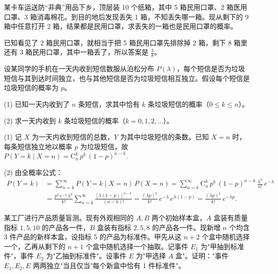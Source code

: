 \documentclass[lang=cn,11pt]{elegantbook}
\begin{document}
\begin{exercise}\label{exer:src-paper1-01}\label{prob:p1-01}
某卡车运送防“非典”用品下乡，顶层装 10 个纸箱，其中 5 箱民用口罩、2 箱医用口罩、3 箱消毒棉花。到目的地后发现丢失 1 箱，不知丢失哪一箱。现从剩下的 9 箱中任意打开 2 箱，结果都是民用口罩，求丢失的一箱也是民用口罩的概率。
\end{exercise}
\begin{solution}
已知看见了 2 箱民用口罩，就相当于把 5 箱民用口罩先排除掉 2 箱，剩下 8 箱里还有 3 箱民用口罩，其中一箱丢了，所以答案是 \(\frac38\)。
\end{solution}

\begin{exercise}[提高]\label{exer:1-55}
设某同学的手机在一天内收到短信数服从泊松分布 \(P(\lambda)\)，每个短信是否为垃圾短信与其到达时间独立，也与其他短信是否为垃圾短信相互独立。假设每个短信是垃圾短信的概率为 \(p\)。\par
(1) 已知一天内收到了 \(n\) 条短信，求其中恰有 \(k\) 条垃圾短信的概率（\(0\le k\le n\)）。\par
(2) 求一天内收到 \(k\) 条垃圾短信的概率（\(k=0,1,2,\dots\)）。
\end{exercise}

\begin{solution}
(1) 记 \(X\) 为一天内收到短信的总数，\(Y\) 为其中垃圾短信的条数。已知 \(X=n\) 时，每条短信独立地以概率 \(p\) 为垃圾短信，故
\(
P(Y=k\mid X=n) = \mathrm{C}_n^k\,p^k\,(1-p)^{n-k}.
\)

(2) 由全概率公式：
\begin{align*}
P(Y=k) &= \sum_{n=k}^{\infty} P(Y=k\mid X=n)\,P(X=n) = \sum_{n=k}^{\infty} \mathrm{C}_n^k\,p^k\,(1-p)^{n-k}\,\frac{\lambda^n}{n!}\,e^{-\lambda} \\
&= \frac{p^k\,e^{-\lambda}\,\lambda^k}{k!}\sum_{n=k}^{\infty}\frac{[\lambda(1-p)]^{n-k}}{(n-k)!} = \frac{(\lambda p)^k}{k!}\,e^{-\lambda}\,e^{\lambda(1-p)} = \frac{(\lambda p)^k}{k!}\,e^{-\lambda p}.
\end{align*}
\end{solution}

\begin{exercise}[提高]
某工厂进行产品质量盲测。现有外观相同的 \(A,B\) 两个初始样本盒，\(A\) 盒装有质量指标 \(1,5,10\) 的产品各一件，\(B\) 盒装有指标 \(2,5,8\) 的产品各一件。现新增 \(n\) 个均含 3 件产品的新样本盒，设指标 5 的产品为标准件。甲先从这 \(n+2\) 个盒中随机选择一个，乙再从剩下的 \(n+1\) 个盒中随机选择一个抽取。记事件 \(E_1\) 为"甲抽到标准件"，事件 \(E_2\) 为"乙抽到标准件"。设事件 \(E\) 为"甲选择 \(A\) 盒"。证明："事件 \(E_1,E_2,E\) 两两独立"当且仅当"每个新盒中恰有 1 件标准件"。
\end{exercise}
\end{document}
